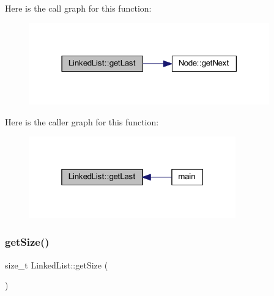 Here is the call graph for this function\+:
\nopagebreak
\begin{figure}[H]
\begin{center}
\leavevmode
\includegraphics[width=294pt]{class_linked_list_ad07d8659b87f77e9fb98a80eb71ed77a_cgraph}
\end{center}
\end{figure}
Here is the caller graph for this function\+:
\nopagebreak
\begin{figure}[H]
\begin{center}
\leavevmode
\includegraphics[width=253pt]{class_linked_list_ad07d8659b87f77e9fb98a80eb71ed77a_icgraph}
\end{center}
\end{figure}
\mbox{\label{class_linked_list_ac8d24166208694f4fe3cc982307b03fb}} 
\subsubsection{\texorpdfstring{get\+Size()}{getSize()}}
{\footnotesize\ttfamily size\+\_\+t Linked\+List\+::get\+Size (\begin{DoxyParamCaption}{ }\end{DoxyParamCaption})}

